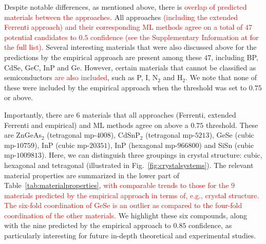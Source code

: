\documentclass[superscriptaddress,unsortedaddress,
 amsmath,amssymb,
 aps,
]{revtex4-2}
\newcommand{\mrk}[1]{\textcolor{red}{#1}}
\begin{document}
Despite notable differences, as mentioned above, there is \mrk{overlap of predicted materials between the approaches}. 
All approaches \mrk{(including the extended Ferrenti approach) and their corresponding ML methods agree on a total of $47$ potential candidates to $0.5$ confidence 
(see the Supplementary Information at \cite{supplementary} for the full list).} 
Several interesting materials that were also discussed above for the predictions by the empirical approach are present among these $47$, including BP, CdSe, GeC, InP and Ge. However, certain materials that cannot be classified as semiconductors \mrk{are also included}, such as P, I, N$_2$ and H$_2$. We note that none of these were included by the empirical approach when the threshold was set to $0.75$ or above. 

Importantly, there are $6$ materials that all approaches (Ferrenti, extended Ferrenti and empirical) and ML methods agree on above a $0.75$ threshold. These are ZnGeAs$_2$ (tetragonal mp-$4008$), CdSnP$_2$ (tetragonal mp-$5213$), GeSe (cubic mp-$10759$), InP (cubic mp-$20351$), InP (hexagonal mp-$966800$) and SiSn (cubic mp-$1009813$). Here, we can distinguish three groupings in crystal structure: cubic, hexagonal and tetragonal (illustrated in Fig.~\ref{fig:crystalsystems}). The relevant material properties are summarized in the lower part of Table~\ref{tab:materialproperties}, 
\mrk{with comparable trends to those for the $9$ materials predicted by the empirical approach in terms of, e.g., crystal structure. The six-fold coordination of GeSe is an outlier as compared to the four-fold coordination of the other materials. }
We highlight these six compounds, along with the nine predicted by the empirical approach to $0.85$ confidence, as particularly interesting for future in-depth theoretical and experimental studies. 
\end{document}

